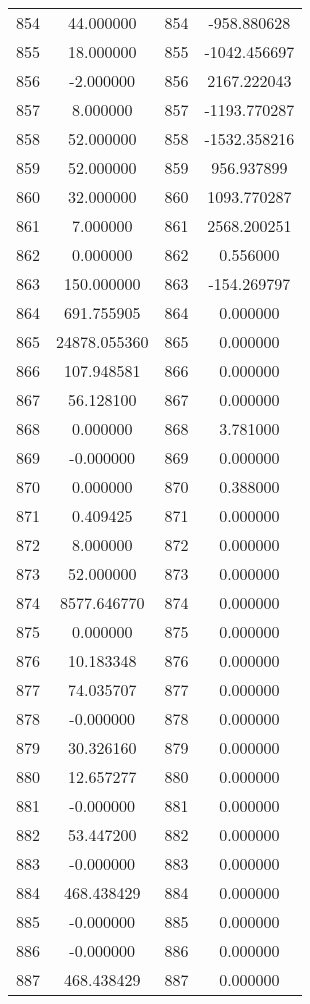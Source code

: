 \documentclass[12pt]{article}
\begin{document}
\begin{longtable}{@{}cccc@{}}
854 & 44.000000 & 854 & -958.880628 \\
855 & 18.000000 & 855 & -1042.456697 \\
856 & -2.000000 & 856 & 2167.222043 \\
857 & 8.000000 & 857 & -1193.770287 \\
858 & 52.000000 & 858 & -1532.358216 \\
859 & 52.000000 & 859 & 956.937899 \\
860 & 32.000000 & 860 & 1093.770287 \\
861 & 7.000000 & 861 & 2568.200251 \\
862 & 0.000000 & 862 & 0.556000 \\
863 & 150.000000 & 863 & -154.269797 \\
864 & 691.755905 & 864 & 0.000000 \\
865 & 24878.055360 & 865 & 0.000000 \\
866 & 107.948581 & 866 & 0.000000 \\
867 & 56.128100 & 867 & 0.000000 \\
868 & 0.000000 & 868 & 3.781000 \\
869 & -0.000000 & 869 & 0.000000 \\
870 & 0.000000 & 870 & 0.388000 \\
871 & 0.409425 & 871 & 0.000000 \\
872 & 8.000000 & 872 & 0.000000 \\
873 & 52.000000 & 873 & 0.000000 \\
874 & 8577.646770 & 874 & 0.000000 \\
875 & 0.000000 & 875 & 0.000000 \\
876 & 10.183348 & 876 & 0.000000 \\
877 & 74.035707 & 877 & 0.000000 \\
878 & -0.000000 & 878 & 0.000000 \\
879 & 30.326160 & 879 & 0.000000 \\
880 & 12.657277 & 880 & 0.000000 \\
881 & -0.000000 & 881 & 0.000000 \\
882 & 53.447200 & 882 & 0.000000 \\
883 & -0.000000 & 883 & 0.000000 \\
884 & 468.438429 & 884 & 0.000000 \\
885 & -0.000000 & 885 & 0.000000 \\
886 & -0.000000 & 886 & 0.000000 \\
887 & 468.438429 & 887 & 0.000000 \\

\end{longtable}
\end{document}
